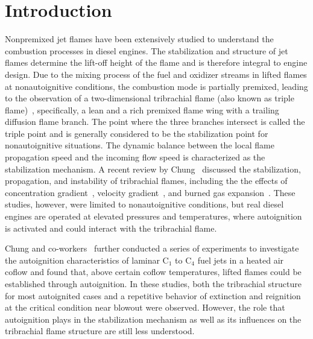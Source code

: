 \documentclass[review,3p,times]{elsarticle}
\begin{document}
\section{Introduction}

Nonpremixed jet flames have been extensively studied to understand the combustion processes in diesel engines.  The stabilization and structure of jet flames determine the lift-off height of the flame and is therefore integral to engine design.  Due to the mixing process of the fuel and oxidizer streams in lifted flames at nonautoignitive conditions, the combustion mode is partially premixed, leading to the observation of a two-dimensional tribrachial flame (also known as triple flame)~\cite{buckmaster02}, specifically, a lean and a rich premixed flame wing with a trailing diffusion flame branch.  The point where the three branches intersect is called the triple point and is generally considered to be the stabilization point for nonautoignitive situations. The dynamic balance between the local flame propagation speed and the incoming flow speed is characterized as the stabilization mechanism.  A recent review by Chung~\cite{chung07} discussed the stabilization, propagation, and instability of tribrachial flames, including the the effects of concentration gradient~\cite{dold89,hartley91,ghosal00}, velocity gradient~\cite{kim07}, and burned gas expansion~\cite{ruetsch95,lee97,plessing98,kioni99}.  These studies, however, were limited to nonautoignitive conditions, but real diesel engines are operated at elevated pressures and temperatures, where autoignition is activated and could interact with the tribrachial flame. 

Chung and co-workers~\cite{choi09,choi10,choi12} further conducted a series of experiments to investigate the autoignition characteristics of laminar C$_1$ to C$_4$ fuel jets in a heated air coflow and found that, above certain coflow temperatures, lifted flames could be established through autoignition.  In these studies, both the tribrachial structure for most autoignited cases and a repetitive behavior of extinction and reignition at the critical condition near blowout were observed.  However, the role that autoignition plays in the stabilization mechanism as well as its influences on the tribrachial flame structure are still less understood.  
\end{document}
